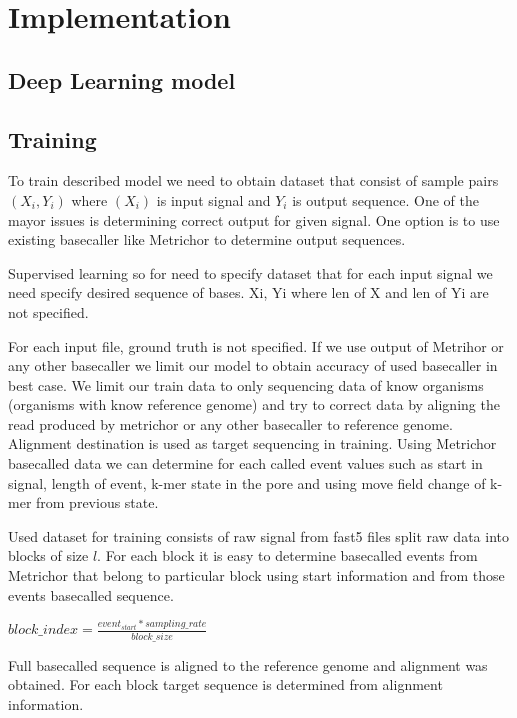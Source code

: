 \documentclass[times, utf8, diplomski, english]{fer}
\begin{document}
\chapter{Implementation}
\section{Deep Learning model}
\section{Training}

To train described model we need to obtain dataset that consist of sample pairs $(X_i, Y_i)$ where $(X_i)$ is input signal and $Y_i$ is output sequence. 
One of the mayor issues is determining correct output for given signal. One option is to use existing basecaller like Metrichor to determine output sequences. 

 




Supervised learning so for need to specify dataset that for each input signal we need specify desired sequence of bases.
{Xi, Yi} where len of X and len of Yi are not specified.

For each input file, ground truth is not specified. If we use output of Metrihor or any other basecaller we limit our model to
obtain accuracy of used basecaller in best case. We limit our train data to only sequencing data of know organisms (organisms with know reference genome) and try to correct data by aligning the read produced by metrichor or any other basecaller to reference genome. Alignment destination is used as target sequencing in training. 
Using Metrichor basecalled data we can determine for each called event values such as start in signal, length of event, k-mer state in the pore and using move field change of k-mer from previous state. 

Used dataset for training consists of raw signal from fast5 files split raw data into blocks of size $l$.
For each block it is easy to determine basecalled events from Metrichor that belong to particular block using start information and from those events basecalled sequence. 


$block\_index =  \frac{event_{start} * sampling\_rate}{block\_size}$

Full basecalled sequence is aligned to the reference genome and alignment was obtained. For each block target sequence is determined from alignment information.
\end{document}
